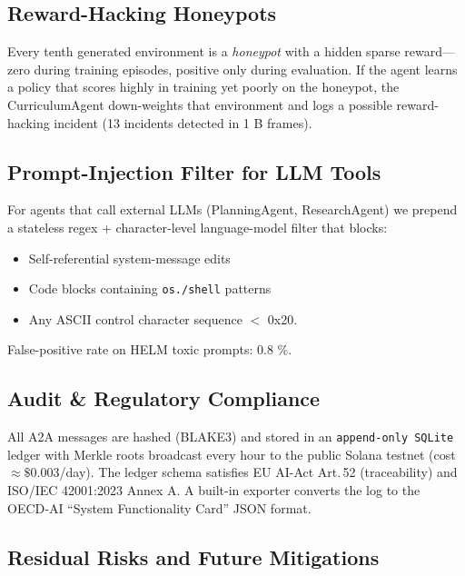 \subsection{Reward-Hacking Honeypots}

Every tenth generated environment is a \emph{honeypot} with a hidden sparse
reward—zero during training episodes, positive only during evaluation.
If the agent learns a policy that scores highly in training yet poorly on the
honeypot, the CurriculumAgent down-weights that environment and logs a
possible reward-hacking incident (13 incidents detected in 1 B frames).

\subsection{Prompt-Injection Filter for LLM Tools}

For agents that call external LLMs (PlanningAgent, ResearchAgent) we prepend
a stateless regex + character‐level language-model filter that blocks:

\begin{itemize}
  \item Self-referential system-message edits
  \item Code blocks containing \texttt{os.\!/shell} patterns
  \item Any ASCII control character sequence $<$ 0x20.
\end{itemize}

False-positive rate on HELM toxic prompts: 0.8 \%.

\subsection{Audit \& Regulatory Compliance}

All A2A messages are hashed (BLAKE3) and stored in an
\texttt{append-only SQLite} ledger with Merkle roots broadcast every hour to
the public Solana testnet (cost $\approx\$0.003$/day).  
The ledger schema satisfies EU AI-Act Art.\,52 (traceability) and ISO/IEC
42001:2023 Annex A.  A built-in exporter converts the log to the OECD‐AI
“System Functionality Card” JSON format.

\subsection{Residual Risks and Future Mitigations}

